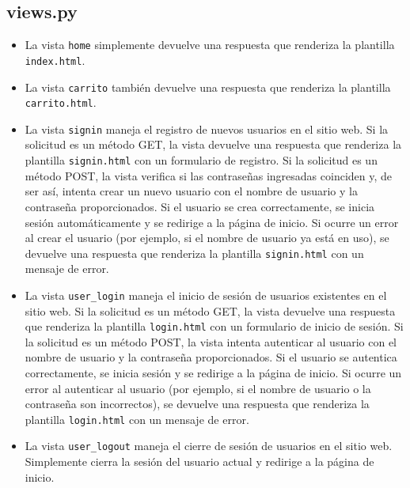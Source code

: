 \documentclass{article}
\begin{document}
	\subsection{views.py}
	\begin{itemize}	
		
			\item La vista \texttt{home} simplemente devuelve una respuesta que renderiza la plantilla \texttt{index.html}.
			\item La vista \texttt{carrito} también devuelve una respuesta que renderiza la plantilla \texttt{carrito.html}.
			\item La vista \texttt{signin} maneja el registro de nuevos usuarios en el sitio web. Si la solicitud es un método GET, la vista devuelve una respuesta que renderiza la plantilla \texttt{signin.html} con un formulario de registro. Si la solicitud es un método POST, la vista verifica si las contraseñas ingresadas coinciden y, de ser así, intenta crear un nuevo usuario con el nombre de usuario y la contraseña proporcionados. Si el usuario se crea correctamente, se inicia sesión automáticamente y se redirige a la página de inicio. Si ocurre un error al crear el usuario (por ejemplo, si el nombre de usuario ya está en uso), se devuelve una respuesta que renderiza la plantilla \texttt{signin.html} con un mensaje de error.
			\item La vista \texttt{user\_login} maneja el inicio de sesión de usuarios existentes en el sitio web. Si la solicitud es un método GET, la vista devuelve una respuesta que renderiza la plantilla \texttt{login.html} con un formulario de inicio de sesión. Si la solicitud es un método POST, la vista intenta autenticar al usuario con el nombre de usuario y la contraseña proporcionados. Si el usuario se autentica correctamente, se inicia sesión y se redirige a la página de inicio. Si ocurre un error al autenticar al usuario (por ejemplo, si el nombre de usuario o la contraseña son incorrectos), se devuelve una respuesta que renderiza la plantilla \texttt{login.html} con un mensaje de error.
			\item La vista \texttt{user\_logout} maneja el cierre de sesión de usuarios en el sitio web. Simplemente cierra la sesión del usuario actual y redirige a la página de inicio.
	\end{itemize}	

		
	
\end{document}
